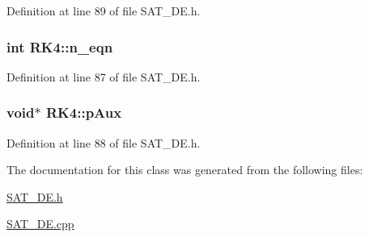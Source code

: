 Definition at line 89 of file S\-A\-T\-\_\-\-D\-E.\-h.

\hypertarget{classRK4_a4bc99fd596f8867c42e55762633e56f7}{
\subsubsection[{n\-\_\-eqn}]{\setlength{\rightskip}{0pt plus 5cm}int R\-K4\-::n\-\_\-eqn\hspace{0.3cm}{\ttfamily [private]}}}\label{classRK4_a4bc99fd596f8867c42e55762633e56f7}


Definition at line 87 of file S\-A\-T\-\_\-\-D\-E.\-h.

\hypertarget{classRK4_aa74081faeb8dbdc9f2a48895e12d2986}{
\subsubsection[{p\-Aux}]{\setlength{\rightskip}{0pt plus 5cm}void$\ast$ R\-K4\-::p\-Aux\hspace{0.3cm}{\ttfamily [private]}}}\label{classRK4_aa74081faeb8dbdc9f2a48895e12d2986}


Definition at line 88 of file S\-A\-T\-\_\-\-D\-E.\-h.



The documentation for this class was generated from the following files\-:\begin{DoxyCompactItemize}
\item 
\hyperlink{SAT__DE_8h}{S\-A\-T\-\_\-\-D\-E.\-h}\item 
\hyperlink{SAT__DE_8cpp}{S\-A\-T\-\_\-\-D\-E.\-cpp}\end{DoxyCompactItemize}

